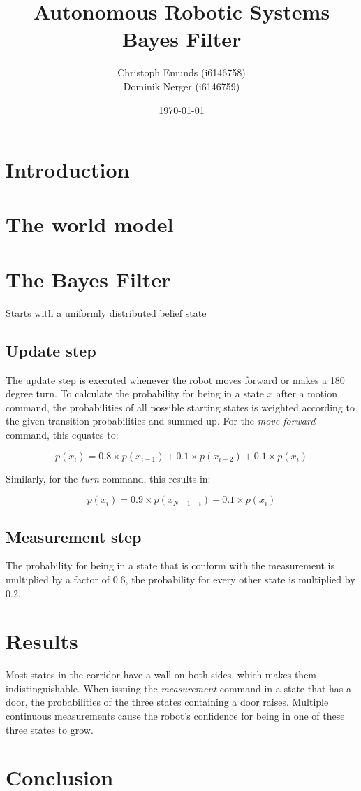 \documentclass[10pt,a4paper]{article}
\author{Christoph Emunds (i6146758)\\Dominik Nerger (i6146759)}
\title{Autonomous Robotic Systems\\Bayes Filter}
\date{\today}
\begin{document}
	\maketitle
	
	\tableofcontents
	
	\section{Introduction}
	
	\section{The world model}
	
	\section{The Bayes Filter}
	Starts with a uniformly distributed belief state
	
		\subsection{Update step}
		The update step is executed whenever the robot moves forward or makes a 180 degree turn.
		To calculate the probability for being in a state $x$ after a motion command, the probabilities of all possible starting states is weighted according to the given transition probabilities and summed up. For the \textit{move forward} command, this equates to:
		
		\begin{displaymath}
			p(x_i) = 0.8\times p(x_{i-1}) + 0.1\times p(x_{i-2}) + 0.1\times p(x_i)
		\end{displaymath}
		
		Similarly, for the \textit{turn} command, this results in:
		
		\begin{displaymath}
			p(x_i) = 0.9\times p(x_{N-1-i}) + 0.1\times p(x_i)
		\end{displaymath}
		
		\subsection{Measurement step}
		The probability for being in a state that is conform with the measurement is multiplied by a factor of $0.6$, the probability for every other state is multiplied by $0.2$.
	
	\section{Results}
	Most states in the corridor have a wall on both sides, which makes them indistinguishable.
	When issuing the \textit{measurement} command in a state that has a door, the probabilities of the three states containing a door raises. Multiple continuous measurements cause the robot's confidence for being in one of these three states to grow.
	
	\section{Conclusion}
	
\end{document}
